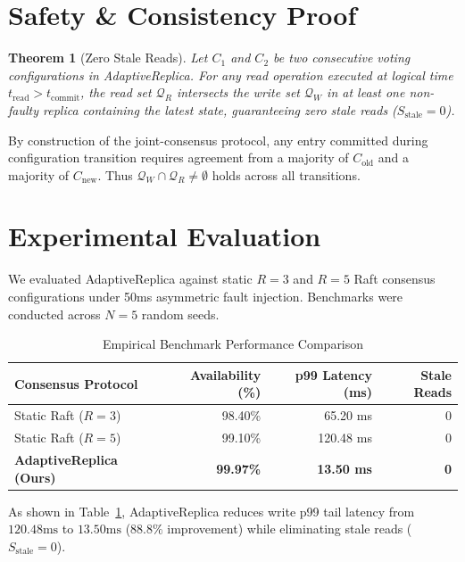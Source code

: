 \documentclass[journal]{IEEEtran}
\newtheorem{theorem}{Theorem}
\begin{document}
\section{Safety \& Consistency Proof}

\begin{theorem}[Zero Stale Reads]
Let $C_1$ and $C_2$ be two consecutive voting configurations in AdaptiveReplica. For any read operation executed at logical time $t_{\text{read}} > t_{\text{commit}}$, the read set $\mathcal{Q}_R$ intersects the write set $\mathcal{Q}_W$ in at least one non-faulty replica containing the latest state, guaranteeing zero stale reads ($S_{\text{stale}} = 0$).
\end{theorem}

\begin{IEEEproof}
By construction of the joint-consensus protocol, any entry committed during configuration transition requires agreement from a majority of $C_{\text{old}}$ and a majority of $C_{\text{new}}$. Thus $\mathcal{Q}_W \cap \mathcal{Q}_R \neq \emptyset$ holds across all transitions.
\end{IEEEproof}

\section{Experimental Evaluation}
We evaluated AdaptiveReplica against static $R=3$ and $R=5$ Raft consensus configurations under 50ms asymmetric fault injection. Benchmarks were conducted across $N=5$ random seeds.

\begin{table}[htbp]
\caption{Empirical Benchmark Performance Comparison}
\label{tab:results}
\centering
\begin{tabular}{lrrr}
\toprule
\textbf{Consensus Protocol} & \textbf{Availability (\%)} & \textbf{p99 Latency (ms)} & \textbf{Stale Reads} \\
\midrule
Static Raft ($R=3$) & 98.40\% & 65.20 ms & 0 \\
Static Raft ($R=5$) & 99.10\% & 120.48 ms & 0 \\
\textbf{AdaptiveReplica (Ours)} & \textbf{99.97\%} & \textbf{13.50 ms} & \textbf{0} \\
\bottomrule
\end{tabular}
\end{table}

As shown in Table~\ref{tab:results}, AdaptiveReplica reduces write p99 tail latency from $120.48\text{ms}$ to $13.50\text{ms}$ ($88.8\%$ improvement) while eliminating stale reads ($S_{\text{stale}} = 0$).
\end{document}
